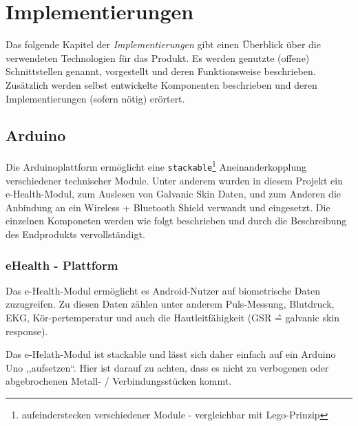 \documentclass[10pt, a4paper, oneside, titlepage]{scrartcl} %
\begin{document}
   	
   	
	\section{Implementierungen}

	Das folgende Kapitel der \textit{Implementierungen} gibt einen Überblick über die verwendeten Technologien für das Produkt. Es werden genutzte (offene) Schnittstellen genannt, vorgestellt und deren Funktionsweise beschrieben. Zusätzlich werden selbst entwickelte Komponenten beschrieben und deren Implementierungen (sofern nötig) erörtert.
	
	\subsection{Arduino}
	
	Die Arduinoplattform ermöglicht eine \texttt{stackable}\footnote{aufeinderstecken verschiedener Module - vergleichbar mit Lego-Prinzip} Aneinanderkopplung verschiedener technischer Module. Unter anderem wurden in diesem Projekt ein e-Health-Modul, zum Auslesen von Galvanic Skin Daten, und zum Anderen die Anbindung an ein Wireless + Bluetooth Shield verwandt und eingesetzt. Die einzelnen Komponeten werden wie folgt beschrieben und durch die Beschreibung des Endprodukts vervollständigt.
		
	\subsubsection{eHealth - Plattform}
	
	Das e-Health-Modul ermöglicht es Android-Nutzer auf biometrische Daten zuzugreifen. Zu diesen Daten zählen unter anderem Puls-Messung, Blutdruck, EKG, Kör-pertemperatur und auch die Hautleitfähigkeit (GSR \^= galvanic skin response).

	Das e-Helath-Modul ist stackable und lässt sich daher einfach auf ein Arduino Uno ,,aufsetzen``. Hier ist darauf zu achten, dass es nicht zu verbogenen oder abgebrochenen Metall- / Verbindungsstücken kommt.
	
\end{document}
